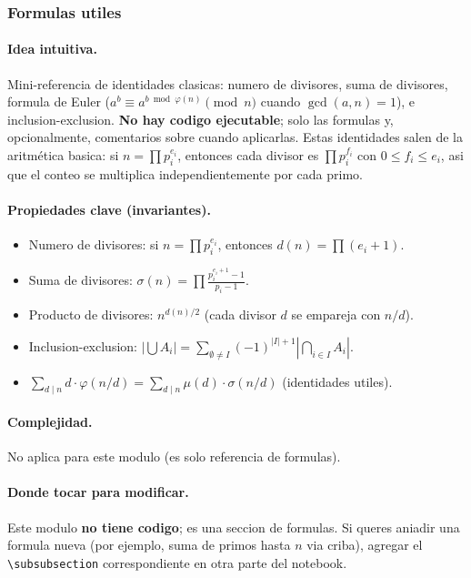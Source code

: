 ﻿\subsubsection{Formulas utiles}

\paragraph{Idea intuitiva.}
Mini-referencia de identidades clasicas: numero de divisores, suma de divisores, formula de Euler ($a^b \equiv a^{b \bmod \varphi(n)} \pmod n$ cuando $\gcd(a,n)=1$), e inclusion-exclusion. \textbf{No hay codigo ejecutable}; solo las formulas y, opcionalmente, comentarios sobre cuando aplicarlas. Estas identidades salen de la aritm\'etica basica: si $n = \prod p_i^{e_i}$, entonces cada divisor es $\prod p_i^{f_i}$ con $0 \le f_i \le e_i$, asi que el conteo se multiplica independientemente por cada primo.

\paragraph{Propiedades clave (invariantes).}
\begin{itemize}\setlength\itemsep{0pt}
	\item Numero de divisores: si $n = \prod p_i^{e_i}$, entonces $d(n) = \prod (e_i + 1)$.
	\item Suma de divisores: $\sigma(n) = \prod \frac{p_i^{e_i+1} - 1}{p_i - 1}$.
	\item Producto de divisores: $n^{d(n)/2}$ (cada divisor $d$ se empareja con $n/d$).
	\item Inclusion-exclusion: $|\bigcup A_i| = \sum_{\emptyset \ne I} (-1)^{|I|+1} |\bigcap_{i \in I} A_i|$.
	\item $\sum_{d \mid n} d \cdot \varphi(n/d) = \sum_{d \mid n} \mu(d) \cdot \sigma(n/d)$ (identidades utiles).
\end{itemize}

\paragraph{Complejidad.}
No aplica para este modulo (es solo referencia de formulas).

\paragraph{Donde tocar para modificar.}
Este modulo \textbf{no tiene codigo}; es una seccion de formulas. Si queres aniadir una formula nueva (por ejemplo, suma de primos hasta $n$ via criba), agregar el \texttt{\textbackslash subsubsection} correspondiente en otra parte del notebook.


